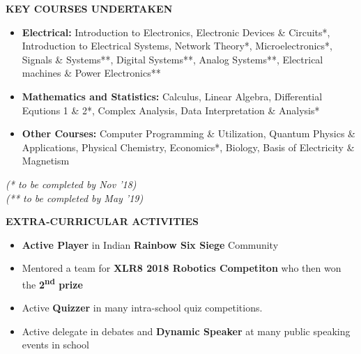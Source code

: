 \documentclass[11pt]{article}%
\begin{document}
\begin{flushleft}
\bf{\LARGE{K}\Large{EY} \LARGE{C}\Large{OURSES} \LARGE{U}\Large{NDERTAKEN}}
\hrulefill

\end{flushleft}
\vspace{-7mm}
\begin{itemize}
\setlength\itemsep{0.01em}
\item \textbf{Electrical:} \nohyphens{Introduction to Electronics, Electronic Devices \& Circuits*, Introduction to Electrical Systems, Network Theory*, Microelectronics*, Signals \& Systems**, Digital Systems**, Analog Systems**, Electrical machines \& Power Electronics**}
\vspace{-1.2mm}
\item \textbf{Mathematics and Statistics:} \nohyphens{Calculus, Linear Algebra, Differential Equtions 1 \& 2*, Complex Analysis, Data Interpretation \& Analysis*}
\vspace{-1.2mm}
\item \textbf{Other Courses:} \nohyphens{Computer Programming \& Utilization, Quantum Physics \& Applications, Physical Chemistry, Economics*,  Biology, Basis of Electricity \& Magnetism}
\end{itemize}
\vspace{-4mm}
\hfill {{{\em{(* to be completed by Nov '18)}}}}\\
\text{ }\hfill{{{\em{(** to be completed by May '19)}}}}
\begin{flushleft}
\bf{\LARGE{E}\Large{XTRA-}\LARGE{C}\Large{URRICULAR} \LARGE{A}\Large{CTIVITIES}}
\hrulefill

\end{flushleft}
\vspace{-4mm}
\begin{itemize}
    \vspace{-2mm}
    \item {\bf Active Player} in Indian {\bf Rainbow Six Siege}  Community
    \vspace{-3mm}
    \item Mentored a team for {\bf XLR8 2018 Robotics Competiton} who then won the {\bf 2\textsuperscript{nd} prize} 
    \vspace{-3mm}
    \item Active {\bf Quizzer} in many intra-school quiz competitions.
    \vspace{-3mm}
    \item Active delegate in debates and \textbf{Dynamic Speaker} at many public speaking events in school
\end{itemize}
\end{document}
